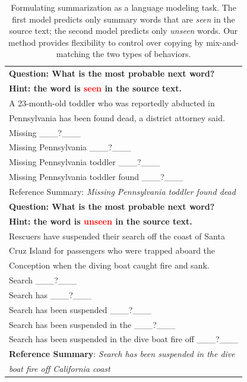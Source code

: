 \documentclass[letterpaper]{article} %
\begin{document}
\begin{table}[t]
\centering
\begin{small}
\begin{tabular}{l}
\toprule
\textbf{Question: What is the most probable next word?}\\
\textbf{Hint: the word is \textcolor{red}{seen} in the source text.}\\
\midrule
A 23-month-old toddler who was reportedly abducted in\\
Pennsylvania has been found dead, a district attorney said.\\
\midrule
Missing \_\_\_?\_\_\_\\
Missing Pennsylvania \_\_\_?\_\_\_\\
Missing Pennsylvania toddler \_\_\_?\_\_\_\\
Missing Pennsylvania toddler found \_\_\_?\_\_\_\\
\midrule
Reference Summary: \emph{Missing Pennsylvania toddler found dead}\\
\bottomrule
\toprule
\textbf{Question: What is the most probable next word?}\\
\textbf{Hint: the word is \textcolor{red}{unseen} in the source text.}\\
\midrule
Rescuers have suspended their search off the coast of Santa \\
Cruz Island for passengers who were trapped aboard the \\
Conception when the diving boat caught fire and sank.\\
\midrule
Search \_\_\_?\_\_\_\\
Search has \_\_\_?\_\_\_\\
Search has been suspended \_\_\_?\_\_\_\\
Search has been suspended in the \_\_\_?\_\_\_\\
Search has been suspended in the dive boat fire off \_\_\_?\_\_\_\\
\midrule
\textbf{Reference Summary}: \emph{Search has been suspended in the dive}\\
\emph{boat fire off California coast}\\
\bottomrule
\end{tabular}
\end{small}
\caption{Formulating summarization as a language modeling task.
The first model predicts only summary words that are \emph{seen} in the source text; the second model predicts only \emph{unseen} words.
Our method provides flexibility to control over copying by mix-and-matching the two types of behaviors.
}
\label{tab:example}
\end{table}
\end{document}
